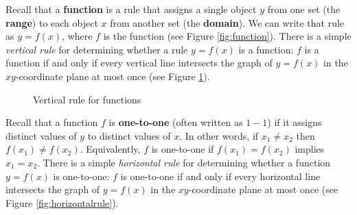 \piccaption[]{\label{fig:function}}
Recall that a \textbf{function} is a rule that assigns a single object $y$ from one
set (the \textbf{range}) to each object $x$ from another set (the
\textbf{domain}). We can write that rule as $y = f(x)$, where $f$ is the function (see
Figure \ref{fig:function}). There is a simple \emph{vertical rule} for determining whether a rule
$y=f(x)$ is a function: $f$ is a function if and only if every vertical line intersects the graph of
$y=f(x)$ in the $xy$-coordinate plane at most once (see  Figure \ref{fig:verticalrule}).

\begin{figure}[h]
 \centering
 \qquad\qquad
 \vspace{-2mm}
 \caption[]{\quad Vertical rule for functions}
 \label{fig:verticalrule}
\end{figure}

Recall that a function $f$ is \textbf{one-to-one} (often written as $1-1$) if
it assigns distinct values of $y$ to distinct values of $x$. In other words, if $x_1 \ne x_2$ then
$f(x_1 ) \ne f(x_2 )$. Equivalently, $f$ is one-to-one if $f(x_1 ) = f(x_2 )$ implies $x_1 = x_2$.
There is a simple \emph{horizontal rule} for determining whether a function $y=f(x)$ is one-to-one:
$f$ is one-to-one if and only if every horizontal line intersects the graph of $y=f(x)$ in the
$xy$-coordinate plane at most once (see Figure \ref{fig:horizontalrule}).

